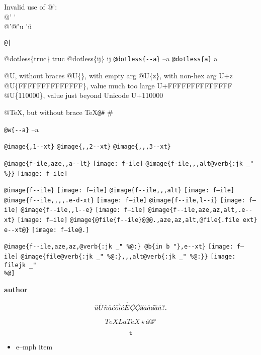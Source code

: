 \documentclass{book}
\renewcommand{\includegraphics}[1]{\fbox{FIG \detokenize{#1}}}
\begin{document}
\begin{titlepage}
Invalid use of @':\leavevmode{}\\
@' \'{}
\leavevmode{}\\
@'@"u \'{}\"{u}

\texttt{@|} 

@dotless\{truc\} truc
@dotless\{ij\} ij
\texttt{@dotless\{{-}{-}a\}} --a
\texttt{@dotless\{a\}} a

@U, without braces @U\{\}, with empty arg 
@U\{z\}, with non-hex arg U+z
@U\{FFFFFFFFFFFFFF\}, value much too large U+FFFFFFFFFFFFFF
@U\{110000\}, value just beyond Unicode U+110000

@TeX, but without brace \TeX{}\texttt{@\#} \#

\texttt{@w\{{-}{-}a\}} \hbox{--a}

\texttt{@image\{,1{-}{-}xt\}} 
\texttt{@image\{{,}{,}2{-}{-}xt\}} 
\texttt{@image\{{,}{,},3{-}{-}xt\}} 

\texttt{@image\{f-ile,aze{,}{,}a{-}{-}lt\}} \texttt{[image: f-ile]}
\texttt{@image\{f-ile{,}{,},alt@verb\{:jk \_" \%\@\}\}} \texttt{[image: f-ile]}

\texttt{@image\{f{-}{-}ile\}} \texttt{[image: f--ile]}
\texttt{@image\{f{-}{-}ile{,}{,},alt\}} \texttt{[image: f--ile]}
\texttt{@image\{f{-}{-}ile{,}{,}{,}{,}.e-d-xt\}} \texttt{[image: f--ile]}
\texttt{@image\{f{-}{-}ile,l{-}{-}i\}} \texttt{[image: f--ile]}
\texttt{@image\{f{-}{-}ile{,}{,}l{-}{-}e\}} \texttt{[image: f--ile]}
\texttt{@image\{f{-}{-}ile,aze,az,alt,.e{-}{-}xt\}} \texttt{[image: f--ile]}
\texttt{@image\{@file\{f{-}{-}ile\}@@@.,aze,az,alt,@file\{.file ext\} e{-}{-}xt@\}} \texttt{[image: f--ile@.]}

\texttt{@image\{f{-}{-}ile,aze,az,@verb\{:jk \_" \%@:\} @b\{in b "\},e{-}{-}xt\}} \texttt{[image: f--ile]}
\texttt{@image\{file@verb\{:jk \_" \%@:\}{,}{,},alt@verb\{:jk \_" \%@:\}\}} \texttt{[image: filejk \_" \\\%@]}


{\bfseries author}%

$$
\ddot{u} \ddot{U} \tilde{n} \hat{a} \acute{e} \bar{o} \grave{i} \acute{e} \grave{\bar{E}}
\textsl{\c{\'{C}}} \textsl{\c{\'{C}}} \textsl{\H{a}} \dot{a} \mathring{a} \textsl{\t{a}}
\breve{a} \check{a}
 ? .
$$

$$
TeX LaTeX \star{} \mathord{\text{\aa{}}} \circledR{} ^{\circ{}} 
$$

$$
\mathtt{t} 
$$

\begin{itemize}[label=\emph{}]
\item e--mph item
\end{itemize}


\end{titlepage}
\end{document}
